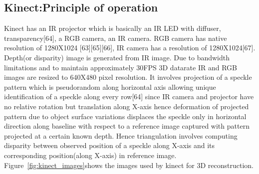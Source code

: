 \subsection{Kinect:Principle of operation}
Kinect has an IR projector which is basically an IR LED with diffuser, transparency[64], a RGB camera, an IR camera. RGB camera has native resolution of 1280X1024 [63][65][66], IR camera has a resolution of 1280X1024[67]. Depth(or disparity) image is generated from IR image. Due to bandwidth limitations and to maintain approximately 30FPS 3D datarate IR and RGB images are resized to 640X480 pixel resolution.\newline
\indent
It involves projection of a speckle pattern which is pseudorandom along horizontal axis allowing unique identification of a speckle along every row[64] since IR camera and projector have no relative rotation but translation along X-axis hence deformation of projected pattern due to object surface variations displaces the speckle only in horizontal direction along baseline with respect to a reference image captured with pattern projected at a certain known depth. Hence triangulation involves computing disparity between observed position of a speckle along X-axis and its corresponding position(along X-axis) in reference image. Figure~\ref{fig:kinect_images}shows the images used by kinect for 3D reconstruction. 

